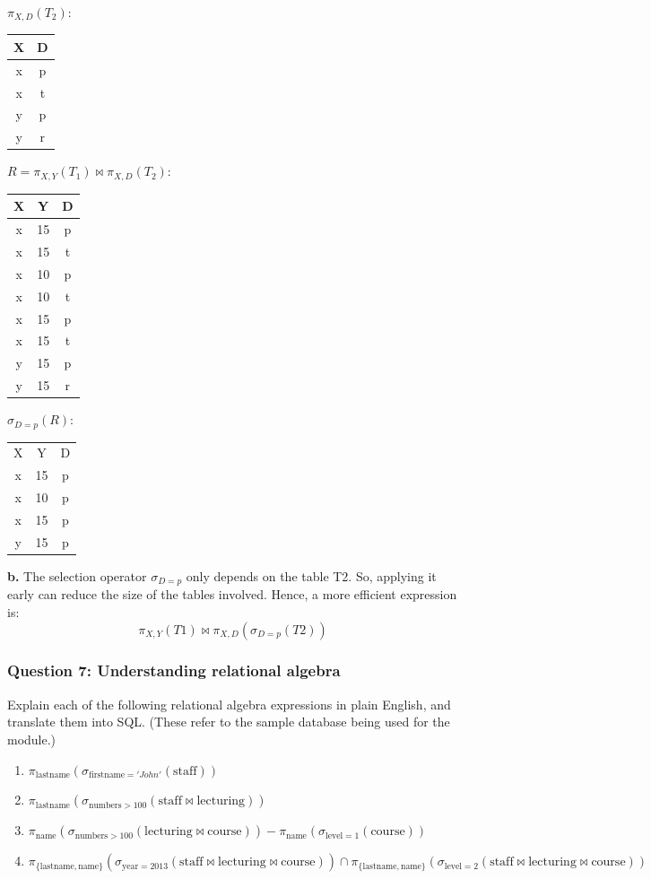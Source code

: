 $\pi_{X,D}(T_2)$:
\begin{tabular}{|c|c|}
\hline
X&D \\
\hline
x&p \\
x&t \\
y&p \\
y&r \\
\hline
\end{tabular}

$R = \pi_{X,Y}(T_1) \bowtie \pi_{X,D}(T_2)$:
\begin{tabular}{|c|c|c|}
\hline
X&Y& D  \\
\hline
x& 15&p \\
x& 15&t \\
x& 10&p \\
x& 10&t \\
x& 15&p \\
x& 15&t \\
y& 15&p \\
y& 15&r \\
\hline
\end{tabular}

$\sigma_{D=p}(R)$:
\begin{tabular}{|c|c|c|}
\hline
X& Y&D \\
x& 15&p \\
x& 10&p \\
x& 15&p \\
y& 15&p \\
\hline
\end{tabular}

\textbf{b.} The selection operator \(\sigma_{D=p}\) only depends on the table T2. So, applying it early can reduce the size of the tables involved. Hence, a more efficient expression is:
\[
\pi_{X,Y}(T1) \bowtie \pi_{X,D}(\sigma_{D=p}(T2))
\]

\subsubsection{Question 7: Understanding relational algebra}

Explain each of the following relational algebra expressions in plain English, and translate them into SQL. (These refer to the sample database being used for the module.)

\begin{enumerate}
    \item[a.] \(\pi_{\text{lastname}}(\sigma_{\text{firstname}='John'}(\text{staff}))\)
    \item[b.] \(\pi_{\text{lastname}}(\sigma_{\text{numbers}>100}(\text{staff} \bowtie \text{lecturing}))\)
    \item[c.] \(\pi_{\text{name}}(\sigma_{\text{numbers}>100}(\text{lecturing} \bowtie \text{course})) - \pi_{\text{name}}(\sigma_{\text{level}=1}(\text{course}))\)
    \item[d.] \(\pi_{\{\text{lastname}, \text{name}\}}(\sigma_{\text{year}=2013}(\text{staff} \bowtie \text{lecturing} \bowtie \text{course})) \cap \pi_{\{\text{lastname}, \text{name}\}}(\sigma_{\text{level}=2}(\text{staff} \bowtie \text{lecturing} \bowtie \text{course}))\)
\end{enumerate}

